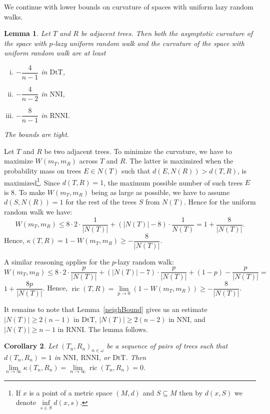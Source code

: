 \documentclass[11pt]{amsart}
\newtheorem{lemma}{Lemma}
\newtheorem{corollary}[lemma]{Corollary}
\theoremstyle{definition}
\newcommand{\nni}{\mathrm{NNI}}
\newcommand{\rnni}{\mathrm{RNNI}}
\newcommand{\dtt}{\mathrm{DtT}}
\newcommand{\ric}{\operatorname{ric}}
\begin{document}
{We continue with lower bounds on curvature of spaces with uniform lazy random walks.

\begin{lemma}
\label{uniformLower}
Let $T$ and $R$ be adjacent trees.
Then both the asymptotic curvature of the space with $p$-lazy uniform random walk and the curvature of the space with uniform random walk are at least
 \begin{enumerate} [(i)]
\item $-\dfrac{4}{n-1}$ in $\dtt$,
\item $-\dfrac{4}{n-2}$ in $\nni$,
\item $-\dfrac{8}{n-1}$ in $\rnni$.
 \end{enumerate} 

The bounds are tight.
\end{lemma}

\proof
Let $T$ and $R$ be two adjacent trees.
To minimize the curvature, we have to maximize $W(m_T, m_R)$ across $T$ and $R$.
The latter is maximized when the probability mass on trees $E\in N(T)$ such that $d(E, N(R)) > d(T, R)$, is
maximized\footnote{If $x$ is a point of a metric space $(M,d)$ and $S \subseteq M$ then by $d(x,S)$ we denote $\inf\limits_{s \in S} d(x,s)$.}.
Since $d(T, R) = 1$, the maximum possible number of such trees $E$ is
$8$.
To make $W(m_T,m_R)$ being as large as possible, we have to assume $d(S, N(R)) = 1$ for the rest of the trees $S$ from $N(T)$.
Hence for the uniform random walk we have:
\[
W(m_T,m_R)\leq 8 \cdot 2 \cdot \frac{1}{|N(T)|} +
(|N(T)| - 8) \cdot \frac{1}{N(T)} = 1 + \dfrac{8}{|N(T)|}.
\]
Hence, $\kappa(T,R) = 1 - W(m_T,m_R) \geq - \dfrac{8}{|N(T)|}$.

A similar reasoning applies for the $p$-lazy random walk:
\[
W(m_T,m_R)\leq 8 \cdot 2 \cdot \frac{p}{|N(T)|} +
(|N(T)| - 7) \cdot \frac{p}{|N(T)|} + (1-p) - \frac{p}{|N(T)|} =
\]
$1 + \dfrac{8p}{|N(T)|}$.
Hence, $\ric(T,R) = \lim\limits_{p\to0}\left(1 - W(m_T,m_R)\right) \geq - \dfrac{8}{|N(T)|}$.

It remains to note that Lemma~\ref{neighBound} gives us an estimate $|N(T)| \geq 2(n-1)$ in $\dtt$, $|N(T)| \geq 2(n-2)$ in $\nni$, and $|N(T)| \geq n-1$ in $\rnni$.
The lemma follows.
\endproof

\begin{corollary}
\label{flatInLimDTS}
Let $(T_n,R_n)_{n\in\omega}$ be a sequence of pairs of trees such that $d(T_n,R_n) = 1$ in $\nni$, $\rnni$, or $\dtt$.
Then $\lim\limits_{n \to \infty}\kappa(T_n,R_n) = \lim\limits_{n \to \infty}\ric(T_n,R_n) = 0$.
\end{corollary}

}
\end{document}
